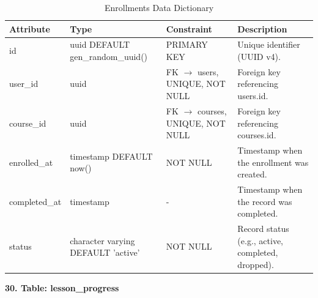 \documentclass[12pt, oneside]{article} %
\newcommand{\tabbreak}{\hyphenpenalty=200\exhyphenpenalty=200\tolerance=4000\hbadness=10000\hspace{0pt}}
\begin{document}
\begin{table}[H]
\caption{Enrollments Data Dictionary}
\label{tab:dd_enrollments}
\vspace{-4mm}
\begin{center}
\renewcommand{\arraystretch}{1.15}
\scriptsize
\begin{tabular}{|>{\raggedright\arraybackslash\tabbreak}p{2.67cm}|>{\raggedright\arraybackslash\tabbreak}p{2.93cm}|>{\raggedright\arraybackslash\tabbreak}p{2.67cm}|>{\raggedright\arraybackslash\tabbreak}p{4.51cm}|}
\hline
\textbf{Attribute} & \textbf{Type} & \textbf{Constraint} & \textbf{Description} \\ \hline
id & uuid DEFAULT gen\_random\_uuid() & PRIMARY KEY & Unique identifier (UUID v4). \\ \hline
user\_id & uuid & FK $\rightarrow$ users, UNIQUE, NOT NULL & Foreign key referencing users.id. \\ \hline
course\_id & uuid & FK $\rightarrow$ courses, UNIQUE, NOT NULL & Foreign key referencing courses.id. \\ \hline
enrolled\_at & timestamp DEFAULT now() & NOT NULL & Timestamp when the enrollment was created. \\ \hline
completed\_at & timestamp & - & Timestamp when the record was completed. \\ \hline
status & character varying DEFAULT 'active' & NOT NULL & Record status (e.g., active, completed, dropped). \\ \hline
\end{tabular}
\end{center}
\end{table}

\textbf{30. Table: lesson\_progress}
\end{document}
